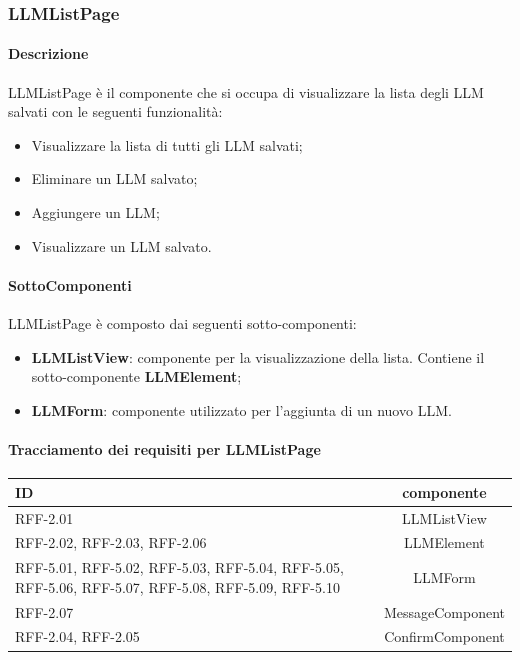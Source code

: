 \subsubsection{LLMListPage} 
\label{sec:LLMListPage}
\paragraph{Descrizione}
LLMListPage è il componente che si occupa di visualizzare la lista degli LLM salvati con le seguenti funzionalità:
\begin{itemize}
    \item Visualizzare la lista di tutti gli LLM salvati;
    \item Eliminare un LLM salvato;
    \item Aggiungere un LLM;
    \item Visualizzare un LLM salvato.
\end{itemize} 
\paragraph{SottoComponenti}
LLMListPage è composto dai seguenti sotto-componenti:
\begin{itemize}
    \item \textbf{LLMListView}: componente per la visualizzazione della lista. Contiene il sotto-componente \textbf{LLMElement};
    \item \textbf{LLMForm}: componente utilizzato per l'aggiunta di un nuovo LLM.
\end{itemize}

\paragraph{Tracciamento dei requisiti per LLMListPage}
\begin{tabularx}{\textwidth}{|X|c|}
    \hline
    \textbf{ID} & \textbf{componente} \\
    \hline
        RFF-2.01 & LLMListView\\
    \hline
        RFF-2.02, RFF-2.03, RFF-2.06  & LLMElement\\
    \hline
        RFF-5.01, RFF-5.02, RFF-5.03, RFF-5.04, RFF-5.05, RFF-5.06, RFF-5.07, RFF-5.08, RFF-5.09, RFF-5.10 & LLMForm\\
    \hline
        RFF-2.07 & MessageComponent\\
    \hline
        RFF-2.04, RFF-2.05 & ConfirmComponent \\
    \hline 
\end{tabularx}